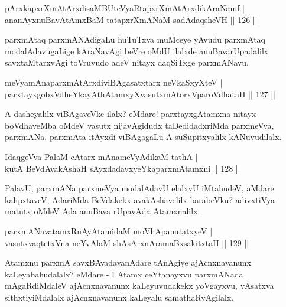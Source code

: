 
\begin{shl}
pArxkapxrXmAtArxdisaMBUteVyaRtapxrXmAtArxdikAraNamf |\\
ananAyxnuBavAtAmxBaM tatapxrXmANaM sadAdaqsheVH \hfill || 126 ||
\end{shl}

\begin{artha}
parxmAtaq parxmANAdigaLu huTuTxva muMceye yAvudu parxmAtaq modalAdavugaLige kAraNavAgi beVre oMdU ilalxde anuBavarUpadalilx savxtaMtarxvAgi toVruvudo adeV nitayx daqSiTxge parxmANavu.
\end{artha}

\begin{shl}
meVyamAnaparxmAtArxdiviBAgasatxtarx neVkaSxyXteV |\\
parxtayxgobxVdheYkayAthAtamxyXvasutxmAtorxVparoVdhataH \hfill || 127 ||
\end{shl}

\begin{artha}
A dasheyalilx viBAgaveVke ilalx? eMdare! parxtayxgAtamxna nitayx boVdhaveMba oMdeV vasutx nijavAgidudx taDedidadxriMda parxmeVya, parxmANa. parxmAta itAyxdi viBAgagaLu A suSupitxyalilx kANuvudilalx.
\end{artha}

\begin{shl}
IdaqgeVva PalaM cAtarx mAnameVyAdikaM tathA |\\
kutA BeVdAvakAshaH sAyxdadavxyeYkaparxmAtamxni \hfill || 128 ||
\end{shl}

\begin{artha}
PalavU, parxmANa parxmeVya modalAdavU elalxvU iMtahudeV, aMdare kalipxtaveV, AdariMda BeVdakekx avakAshavelilx barabeVku? adivxtiVya matutx oMdeV Ada anuBava rUpavAda Atamxnalilx.
\end{artha}

\begin{shl}
parxmANavatamxRnA\s \s yAtamidaM moVhApanutatxyeV |\\
vasutxvaqtetxVna neYvAlaM shAsArxnAramaBxsakitxtaH \hfill || 129 ||
\end{shl}

\begin{artha}
Atamxnu parxmA savxBAvadavanAdare tAnAgiye ajAcnxnavanunx kaLeyabahudalalx? eMdare - I Atamx ceYtanayxvu parxmANada mAgaRdiMdaleV ajAcnxnavanunx kaLeyuvudakekx yoVgayxvu, vAsatxva sithxtiyiMdalalx ajAcnxnavanunx kaLeyalu samathaRvAgilalx.
\end{artha}

